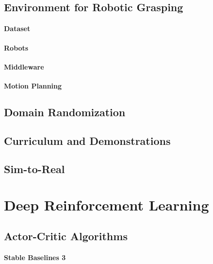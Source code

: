 \subsection{Environment for Robotic Grasping}

\paragraph{Dataset}

\paragraph{Robots}

\paragraph{Middleware}

\paragraph{Motion Planning}


\subsection{Domain Randomization}


\subsection{Curriculum and Demonstrations}


\subsection{Sim-to-Real}





\section{Deep Reinforcement Learning}


\subsection{Actor-Critic Algorithms}

\paragraph{Stable Baselines 3}


